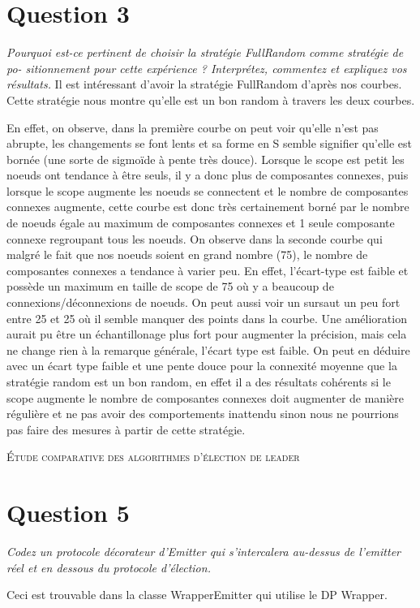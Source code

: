 \documentclass[11pt,a4paper,sans]{report}
\begin{document}
	\section{Question 3}
	\textit{Pourquoi est-ce pertinent de choisir la stratégie FullRandom comme stratégie de po- sitionnement pour cette expérience ?  Interprétez, commentez et expliquez vos résultats.}
	Il est intéressant d'avoir la stratégie FullRandom d'après nos courbes. Cette stratégie nous montre qu'elle est un bon random à travers les deux courbes.

	En effet, on observe, dans la première courbe on peut voir qu'elle n'est pas abrupte, les changements se font lents et sa forme en S semble signifier qu'elle est bornée (une sorte de sigmoïde à pente très douce). Lorsque le scope est petit les noeuds ont tendance à être seuls, il y a donc plus de composantes connexes, puis lorsque le scope augmente les noeuds se connectent et le nombre de composantes connexes augmente, cette courbe est donc très certainement borné par le nombre de noeuds égale au maximum de composantes connexes et 1 seule composante connexe regroupant tous les noeuds.
	On observe dans la seconde courbe qui malgré le fait que nos noeuds soient en grand nombre (75), le nombre de composantes connexes a tendance à varier peu. En effet, l'écart-type est faible et possède un maximum en taille de scope de 75 où y a beaucoup de connexions/déconnexions de noeuds. On peut aussi voir un sursaut un peu fort entre 25 et 25 où il semble manquer des points dans la courbe. Une amélioration aurait pu être un échantillonage plus fort pour augmenter la précision, mais cela ne change rien à la remarque générale, l'écart type est faible.
	On peut en déduire avec un écart type faible et une pente douce pour la connexité moyenne que la stratégie random est un bon random, en effet il a des résultats cohérents si le scope augmente le nombre de composantes connexes doit augmenter de manière régulière et ne pas avoir des comportements inattendu sinon nous ne pourrions pas faire des mesures à partir de cette stratégie.

	\newpage
	\begin{center}
		\textsc{\large Étude comparative des algorithmes d’élection de leader}
	\end{center}
	\section{Question 5}
	\textit{Codez un protocole décorateur d’Emitter qui s’intercalera au-dessus de l’emitter réel et en dessous du protocole d’élection.}
	\par Ceci est trouvable dans la classe WrapperEmitter qui utilise le DP Wrapper.
\end{document}
